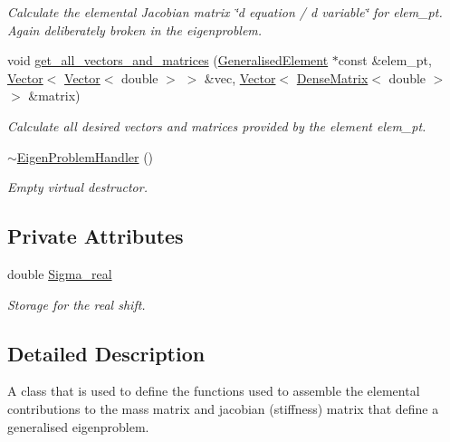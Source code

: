\begin{DoxyCompactItemize}
\begin{DoxyCompactList}\small\item\em Calculate the elemental Jacobian matrix \char`\"{}d equation 
/ d variable\char`\"{} for elem\+\_\+pt. Again deliberately broken in the eigenproblem. \end{DoxyCompactList}\item 
void \hyperlink{classoomph_1_1EigenProblemHandler_aa88f56b5c724c41e0c2926434ae920da}{get\+\_\+all\+\_\+vectors\+\_\+and\+\_\+matrices} (\hyperlink{classoomph_1_1GeneralisedElement}{Generalised\+Element} $\ast$const \&elem\+\_\+pt, \hyperlink{classoomph_1_1Vector}{Vector}$<$ \hyperlink{classoomph_1_1Vector}{Vector}$<$ double $>$ $>$ \&vec, \hyperlink{classoomph_1_1Vector}{Vector}$<$ \hyperlink{classoomph_1_1DenseMatrix}{Dense\+Matrix}$<$ double $>$ $>$ \&matrix)
\begin{DoxyCompactList}\small\item\em Calculate all desired vectors and matrices provided by the element elem\+\_\+pt. \end{DoxyCompactList}\item 
\hyperlink{classoomph_1_1EigenProblemHandler_aa103e5d9d14e498eeeb07cf8be50cd0d}{$\sim$\+Eigen\+Problem\+Handler} ()
\begin{DoxyCompactList}\small\item\em Empty virtual destructor. \end{DoxyCompactList}\end{DoxyCompactItemize}
\subsection*{Private Attributes}
\begin{DoxyCompactItemize}
\item 
double \hyperlink{classoomph_1_1EigenProblemHandler_a1fc4ffdc95087fae83ddfd61004f6c83}{Sigma\+\_\+real}
\begin{DoxyCompactList}\small\item\em Storage for the real shift. \end{DoxyCompactList}\end{DoxyCompactItemize}


\subsection{Detailed Description}
A class that is used to define the functions used to assemble the elemental contributions to the mass matrix and jacobian (stiffness) matrix that define a generalised eigenproblem. 

